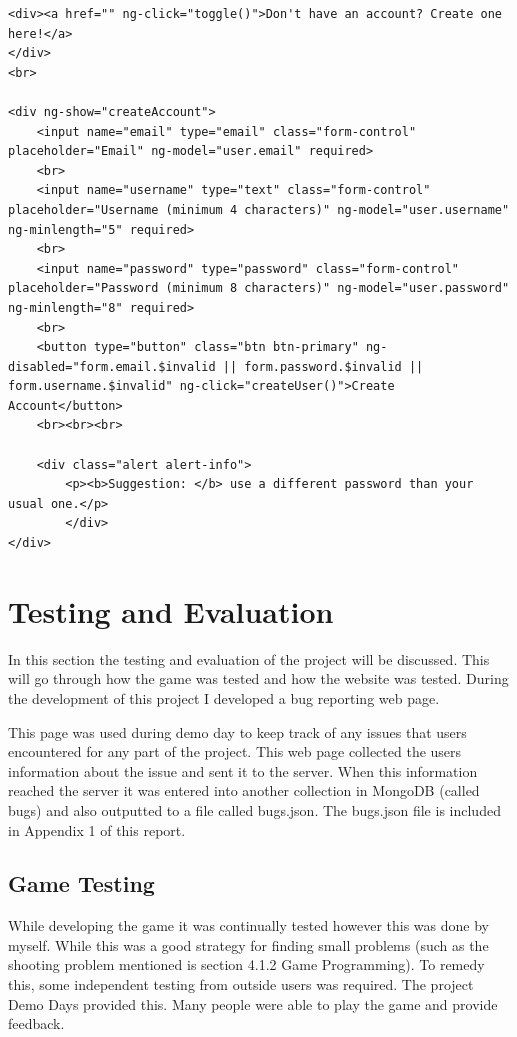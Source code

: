 \documentclass[12pt]{article}
\begin{document}

\begin{lstlisting}
<div><a href="" ng-click="toggle()">Don't have an account? Create one here!</a>
</div>
<br>

<div ng-show="createAccount">
	<input name="email" type="email" class="form-control" placeholder="Email" ng-model="user.email" required>
	<br>
	<input name="username" type="text" class="form-control" placeholder="Username (minimum 4 characters)" ng-model="user.username" ng-minlength="5" required>
	<br>
	<input name="password" type="password" class="form-control" placeholder="Password (minimum 8 characters)" ng-model="user.password" ng-minlength="8" required>
	<br>
	<button type="button" class="btn btn-primary" ng-disabled="form.email.$invalid || form.password.$invalid || form.username.$invalid" ng-click="createUser()">Create Account</button>
	<br><br><br>

	<div class="alert alert-info">
		<p><b>Suggestion: </b> use a different password than your usual one.</p>
		</div>
</div>
\end{lstlisting}

\newpage
\section{Testing and Evaluation}
In this section the testing and evaluation of the project will be discussed. This will go through how the game was tested and how the website was tested. During the development of this project I developed a bug reporting web page. 

This page was used during demo day to keep track of any issues that users encountered for any part of the project. This web page collected the users information about the issue and sent it to the server. When this information reached the server it was entered into another collection in MongoDB (called bugs) and also outputted to a file called bugs.json. The bugs.json file is included in Appendix 1 of this report. 

\subsection{Game Testing}
While developing the game it was continually tested however this was done by myself. While this was a good strategy for finding small problems (such as the shooting problem mentioned is section 4.1.2 Game Programming). To remedy this, some independent testing from outside users was required. The project Demo Days provided this. Many people were able to play the game and provide feedback. 
\end{document}

